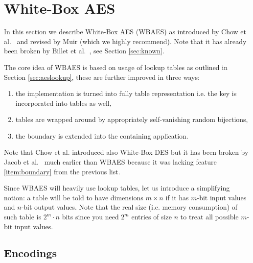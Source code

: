 \section{White-Box AES}
\label{sec:wbaes}

In this section we describe White-Box AES (WBAES) as introduced by Chow et al.\ \cite{chow2003aes} and revised by Muir \cite{muir2013tutorial} (which we highly recommend). Note that it has already been broken by Billet et al.\ \cite{billet2005cryptanalysis}, see Section \ref{sec:known}.   %

The core idea of WBAES is based on usage of lookup tables as outlined in Section \ref{sec:aeslookup}, these are further improved in three ways:
\begin{enumerate}
	\item the implementation is turned into fully table representation i.e. the key is incorporated into tables as well,
	\item tables are wrapped around by appropriately self-vanishing random bijections, \label{item:wrap}
	\item the boundary is extended into the containing application. \label{item:boundary}
\end{enumerate}
Note that Chow et al. introduced also White-Box DES \cite{chow2003des} but it has been broken by Jacob et al.\ \cite{jacob2002attacking} much earlier than WBAES because it was lacking feature \ref{item:boundary} from the previous list.

\begin{notion}
\label{notion:table}
	Since WBAES will heavily use lookup tables, let us introduce a simplifying notion: a table will be told to have dimensions $m\times n$ if it has $m$-bit input values and $n$-bit output values. Note that the real size (i.e. memory consumption) of such table is $2^m\cdot n$ bits since you need $2^m$ entries of size $n$ to treat all possible $m$-bit input values.
\end{notion}



\subsection{Encodings}

